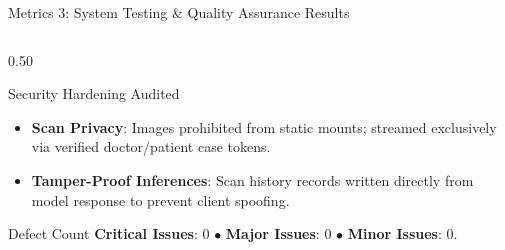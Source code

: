 \documentclass[aspectratio=169, 10pt]{beamer}
\begin{document}
\begin{frame}{Metrics 3: System Testing \& Quality Assurance Results}
\begin{columns}[T]
\begin{column}{0.50\textwidth}
\begin{alertblock}{Security Hardening Audited}
\begin{itemize}
                \item \textbf{Scan Privacy}: Images prohibited from static mounts; streamed exclusively via verified doctor/patient case tokens.
                \item \textbf{Tamper-Proof Inferences}: Scan history records written directly from model response to prevent client spoofing.
            \end{itemize}
        \end{alertblock}
        \begin{block}{Defect Count}
            \scriptsize \textbf{Critical Issues}: 0 \quad $\bullet$ \quad \textbf{Major Issues}: 0 \quad $\bullet$ \quad \textbf{Minor Issues}: 0.
        \end{block}
    \end{column}
\end{columns}
\end{frame}
\end{document}
